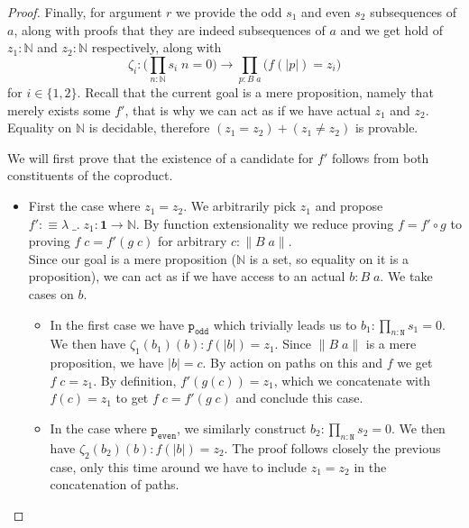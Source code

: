 \documentclass[12pt]{report}
\theoremstyle{definition}
\begin{document}
\begin{proof}
Finally, for argument $r$ we provide the odd $s_1$ and even $s_2$ subsequences of $a$, along with proofs that they are indeed subsequences of $a$ and we get hold of $z_1 : \mathbb{N}$ and $z_2 : \mathbb{N} $ respectively, along with 
$$\zeta_i : \big(\prod_{n : \mathbb{N}}s_i\; n = 0 \big)\rightarrow \prod_{p : B\; a}\big(f(|p|)=z_i\big)$$
for $i \in \{1,2\}$. 
Recall that the current goal is a mere proposition, namely that merely exists some $f'$, that is why we can act as if we have actual $z_1$ and $z_2$. 
Equality on $\mathbb{N}$ is decidable, therefore $(z_1 = z_2) + (z_1 \neq z_2)$ is provable. 

We will first prove that the existence of a candidate for $f'$ follows from both constituents of the coproduct.
\begin{itemize}
\item First the case where $z_1= z_2$. 
We arbitrarily pick $z_1$ and propose $f' : \equiv \lambda \;\_.\; z_1 : \mathbf{1} \rightarrow \mathbb{N}$. 
By function extensionality we reduce proving $f= f' \circ g$ to proving $f\; c = f'(g\; c)$ for arbitrary $c : \lVert B\; a\rVert$.\\
Since our goal is a mere proposition ($\mathbb{N}$ is a set, so equality on it is a proposition), we can act as if we have access to an actual $b : B\; a$. 
We take cases on $b$. 
\begin{itemize}
\item In the first case we have $\mathtt{p_{odd}}$ which trivially leads us to $b_1 : \prod_{n : \mathtt{N}}s_1 = 0$. 
We then have $\zeta_1(b_1)(b) : f(|b|) = z_1$. 
Since $\lVert B\; a\rVert$ is a mere proposition, we have $|b| =c$. 
By action on paths on this and $f$ we get $f\; c= z_1$. 
By definition, $f'(g(c)) = z_1$, which we concatenate with $f(c) = z_1$ to get $f\; c = f'(g\; c)$ and conclude this case.
\item In the case where $\mathtt{p_{even}}$, we similarly construct $b_2 : \prod_{n : \mathtt{N}}s_2 = 0$. 
We then have $\zeta_2(b_2)(b) : f(|b|) = z_2$. 
The proof follows closely the previous case, only this time around we have to include $z_1=z_2$ in the concatenation of paths.

\end{itemize}


\end{itemize}
\end{proof}
\end{document}
